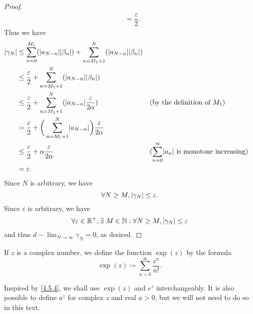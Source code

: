 \begin{proof}
\begin{align*}
                                                       & = \dfrac{\varepsilon}{2}.
  \end{align*}
  Thus we have
  \begin{align*}
    \abs{\gamma_N} & \leq \sum_{n = 0}^{M_1} (\abs{a_{N - n}} \abs{\beta_n}) + \sum_{n = M_1 + 1}^N (\abs{a_{N - n}} \abs{\beta_n})                                                                        \\
                   & \leq \dfrac{\varepsilon}{2} + \sum_{n = M_1 + 1}^N (\abs{a_{N - n}} \abs{\beta_n})                                                                                                    \\
                   & \leq \dfrac{\varepsilon}{2} + \sum_{n = M_1 + 1}^N (\abs{a_{N - n}} \dfrac{\varepsilon}{2 \alpha})             &  & \text{(by the definition of \(M_1\))}                             \\
                   & = \dfrac{\varepsilon}{2} + \bigg(\sum_{n = M_1 + 1}^N \abs{a_{N - n}}\bigg) \dfrac{\varepsilon}{2 \alpha}                                                                             \\
                   & \leq \dfrac{\varepsilon}{2} + \alpha \dfrac{\varepsilon}{2 \alpha}                                             &  & \text{(\(\sum_{n = 0}^\infty \abs{a_n}\) is monotone increasing)} \\
                   & = \varepsilon.
  \end{align*}
  Since \(N\) is arbitrary, we have
  \[
    \forall N \geq M, \left\lvert\gamma_N\right\rvert \leq \varepsilon.
  \]
  Since \(\varepsilon\) is arbitrary, we have
  \[
    \forall \varepsilon \in \mathbb{R}^+, \exists\ M \in \mathbb{N} : \forall N \geq M, \left\lvert\gamma_N\right\rvert \leq \varepsilon
  \]
  and thus \(d - \lim_{N \to \infty} \gamma_N = 0\), as desired.
\end{proof}

\begin{defn}\label{4.6.15}
  If \(z\) is a complex number, we define the function \(\exp(z)\) by the formula
  \[
    \exp(z) \coloneqq \sum_{n = 0}^\infty \dfrac{z^n}{n!}.
  \]
\end{defn}

\begin{note}
  Inspired by \cref{4.5.4}, we shall use \(\exp(z)\) and \(e^z\) interchangeably.
  It is also possible to define \(a^z\) for complex \(z\) and real \(a > 0\), but we will not need to do so in this text.
\end{note}

